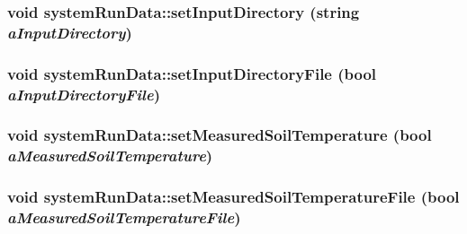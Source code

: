 \label{classsystem_run_data_aad9a2f50dfcaf2c682ad1e5d9e31d724}
\hypertarget{classsystem_run_data_a6cd0640a7b35d97e5aa55dff06e73657}{
\subsubsection[{setInputDirectory}]{\setlength{\rightskip}{0pt plus 5cm}void systemRunData::setInputDirectory (string {\em aInputDirectory})}}
\label{classsystem_run_data_a6cd0640a7b35d97e5aa55dff06e73657}
\hypertarget{classsystem_run_data_afce574d9174abd9e51f8c55011accd07}{
\subsubsection[{setInputDirectoryFile}]{\setlength{\rightskip}{0pt plus 5cm}void systemRunData::setInputDirectoryFile (bool {\em aInputDirectoryFile})}}
\label{classsystem_run_data_afce574d9174abd9e51f8c55011accd07}
\hypertarget{classsystem_run_data_a8f9ae87873668093ea6986afc56a8a62}{
\subsubsection[{setMeasuredSoilTemperature}]{\setlength{\rightskip}{0pt plus 5cm}void systemRunData::setMeasuredSoilTemperature (bool {\em aMeasuredSoilTemperature})}}
\label{classsystem_run_data_a8f9ae87873668093ea6986afc56a8a62}
\hypertarget{classsystem_run_data_a1fc08424c4b79e344456650391c2a403}{
\subsubsection[{setMeasuredSoilTemperatureFile}]{\setlength{\rightskip}{0pt plus 5cm}void systemRunData::setMeasuredSoilTemperatureFile (bool {\em aMeasuredSoilTemperatureFile})}}
